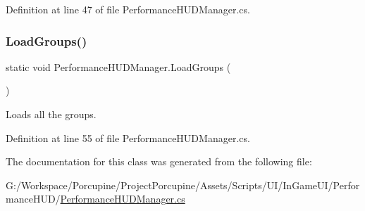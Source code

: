 Definition at line 47 of file Performance\+H\+U\+D\+Manager.\+cs.

\mbox{\label{class_performance_h_u_d_manager_aecf644c11bb2555b50d4c718cbe240d7}} 
\subsubsection{\texorpdfstring{Load\+Groups()}{LoadGroups()}}
{\footnotesize\ttfamily static void Performance\+H\+U\+D\+Manager.\+Load\+Groups (\begin{DoxyParamCaption}{ }\end{DoxyParamCaption})\hspace{0.3cm}{\ttfamily [static]}}



Loads all the groups. 



Definition at line 55 of file Performance\+H\+U\+D\+Manager.\+cs.



The documentation for this class was generated from the following file\+:\begin{DoxyCompactItemize}
\item 
G\+:/\+Workspace/\+Porcupine/\+Project\+Porcupine/\+Assets/\+Scripts/\+U\+I/\+In\+Game\+U\+I/\+Performance\+H\+U\+D/\hyperlink{_performance_h_u_d_manager_8cs}{Performance\+H\+U\+D\+Manager.\+cs}\end{DoxyCompactItemize}
